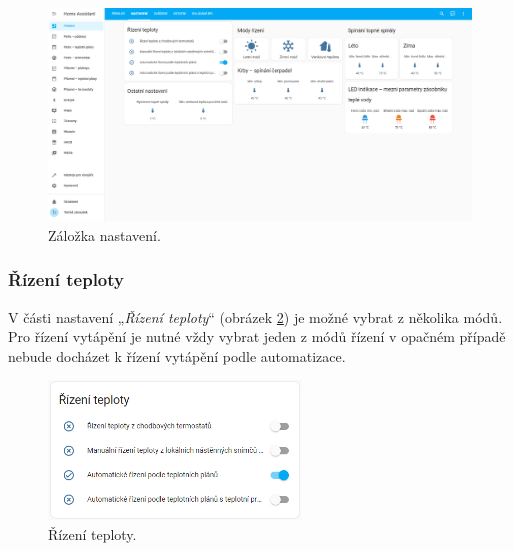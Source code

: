 \begin{Czech}
\begin{figure}[H]
    \centering
    \includegraphics[width=1\textwidth]{pictures/czech/software/tab-settings.png}
    \caption{Záložka nastavení.}
    \label{fig:tab-settings}
\end{figure}
\end{Czech}


\begin{Czech}
\subsubsection{Řízení teploty}
\end{Czech}
\label{sec:temperature-control}

\begin{Czech}
V části nastavení „\textit{Řízení teploty}“ (obrázek \ref{fig:temperature-control}) je možné vybrat z  několika módů. Pro řízení vytápění je nutné vždy vybrat jeden z módů řízení v opačném případě nebude docházet k řízení vytápění podle automatizace.
\end{Czech}

\begin{Czech}
\begin{figure}[H]
    \centering
    \includegraphics[width=0.6\textwidth]{pictures/czech/software/temperature-control.png}
    \caption{Řízení teploty.}
    \label{fig:temperature-control}
\end{figure}
\end{Czech}

